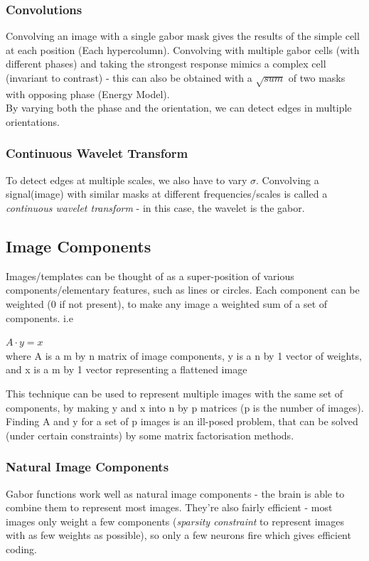 \subsubsection{Convolutions}
Convolving an image with a single gabor mask gives the results of the simple cell at each position (Each hypercolumn). Convolving with multiple gabor cells (with different phases) and taking the strongest response mimics a complex cell (invariant to contrast) - this can also be obtained with a $\sqrt{sum}$ of two masks with opposing phase (Energy Model).\\

By varying both the phase and the orientation, we can detect edges in multiple orientations. 

\subsubsection{Continuous Wavelet Transform}
To detect edges at multiple scales, we also have to vary $\sigma$. Convolving a signal(image) with similar masks at different frequencies/scales is called a \emph{continuous wavelet transform} - in this case, the wavelet is the gabor.

\subsection{Image Components}
Images/templates can be thought of as a super-position of various components/elementary features, such as lines or circles. Each component can be weighted (0 if not present), to make any image a weighted sum of a set of components. i.e
\begin{center}
    $A \cdot y = x$ \\
    where A is a m by n matrix of image components, y is a n by 1 vector of weights, and x is a m by 1 vector representing a flattened image
\end{center} 
This technique can be used to represent multiple images with the same set of components, by making y and x into n by p matrices (p is the number of images). Finding A and y for a set of p images is an ill-posed problem, that can be solved (under certain constraints) by some matrix factorisation methods. \\

\subsubsection{Natural Image Components}
Gabor functions work well as natural image components - the brain is able to combine them to represent most images. They're also fairly efficient - most images only weight a few components (\emph{sparsity constraint} to represent images with as few weights as possible), so only a few neurons fire which gives efficient coding. \\

